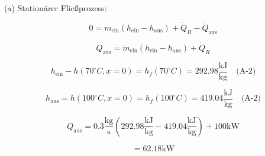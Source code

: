 (a) Stationärer Fließprozess:

\[
0 = \dot{m}_{\text{ein}} (h_{\text{ein}} - h_{\text{aus}}) + \dot{Q}_R - \dot{Q}_{\text{aus}}
\]

\[
\dot{Q}_{\text{aus}} = \dot{m}_{\text{ein}} (h_{\text{ein}} - h_{\text{aus}}) + \dot{Q}_R
\]

\[
h_{\text{ein}} - h(70^\circ C, x=0) = h_f(70^\circ C) = 292.98 \frac{\text{kJ}}{\text{kg}} \quad \text{(A-2)}
\]

\[
h_{\text{aus}} = h(100^\circ C, x=0) = h_f(100^\circ C) = 419.04 \frac{\text{kJ}}{\text{kg}} \quad \text{(A-2)}
\]

\[
\dot{Q}_{\text{aus}} = 0.3 \frac{\text{kg}}{\text{s}} \left( 292.98 \frac{\text{kJ}}{\text{kg}} - 419.04 \frac{\text{kJ}}{\text{kg}} \right) + 100 \text{kW}
\]

\[
= 62.18 \text{kW}
\]